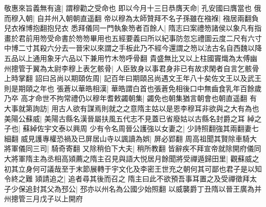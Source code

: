 敬惠來旨義無有違|{
	謂穆勸之受命也}
即以今月十三日恭膺天命|{
	孔安國曰膺當也}
俄而穆入朝|{
	自并州入朝朝直遥翻}
帝以穆為太師贊拜不名子孫雖在襁褓|{
	襁居兩翻負兒衣褓博抱翻抱兒衣}
悉拜儀同一門執象笏者百餘人|{
	隋志曰案禮笏諸侯以象凡有指畫於君前用笏受命書於笏笏畢用也五經要義曰所以紀事防忽忘禮圖云度二尺有六寸中博二寸其殺六分去一晉宋以來謂之手板此乃不經今還謂之笏以法古名自西魏以降五品以上通用象牙六品以下兼用竹木笏呼骨翻}
貴盛無比又以上柱國竇熾為太傅幽州摠管于翼為太尉李穆上表乞骸骨|{
	人臣致身以事君身非已有故求閑者自言乞骸骨上時掌翻}
詔曰呂尚以期頤佐周|{
	記百年曰期頤呂尚遇文王年八十矣佐文王以及武王則是期頤之年也}
張蒼以華皓相漢|{
	華皓謂白首也張蒼免相後口中無齒食乳年百餘歲乃卒}
高才命世不拘常禮仍以穆年耆敕蠲朝集|{
	蠲免也朝集猶言朝會也朝直遥翻}
有大事就第詢訪|{
	用古人欲有謀焉則就之之意隋主姑以是恩李穆耳非欲與之大有為也}
美陽公蘇威|{
	美陽古縣名漢晉屬扶風五代志不見蓋已省廢姑以古縣名封爵之耳}
綽之子也|{
	蘇綽佐宇文泰以興周}
少有令名周晉公護強以女妻之|{
	少詩照翻強其兩翻妻七細翻}
威見護專權恐禍及已屏居山寺以諷讀為娯|{
	屏必郢翻}
周高祖聞其賢除車騎大將軍儀同三司|{
	騎奇寄翻}
又除稍伯下大夫|{
	稍所教翻}
皆辭疾不拜宣帝就除開府儀同大將軍隋主為丞相高熲薦之隋主召見與語大悦居月餘聞將受禪遁歸田里|{
	觀蘇威之初其立身何可議哉至于末節展轉于宇文化及李密王世充之朝何其可鄙也君子是以知令終之難}
熲請追之|{
	追者尋其後而召之}
隋主曰此不欲預吾事耳置之及受禪徵拜太子少保追封其父為邳公|{
	邳亦以州名為公國少始照翻}
以威襲爵丁丑隋以晉王廣為并州摠管三月戊子以上開府

